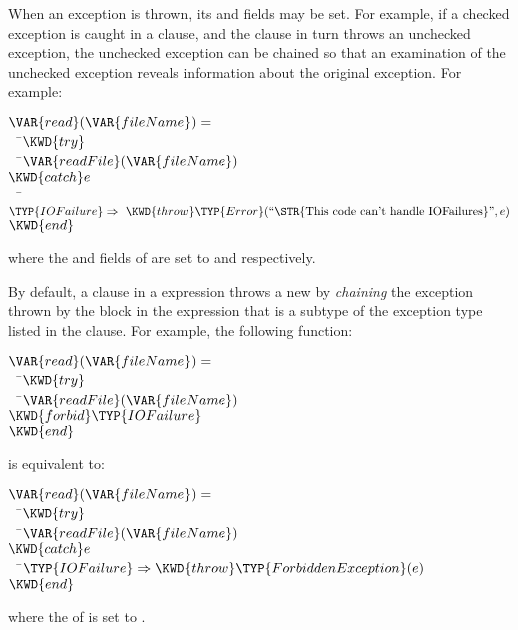 When an exception is thrown, its  and  fields may
be set.
For example, if a checked exception is caught in a  clause, and
the  clause in turn throws an unchecked exception, the unchecked
exception can be chained so that an examination of the unchecked exception
reveals information about the original exception.  For example:
\begin{Fortress}
\(\VAR{read}(\VAR{fileName}) = \)\\
{\tt~~}\pushtabs\=\+\(  \KWD{try}\)\\
{\tt~~}\pushtabs\=\+\(    \VAR{readFile}(\VAR{fileName})\)\-\\\poptabs
\(  \KWD{catch} e\)\\
{\tt~~}\pushtabs\=\+\(    \TYP{IOFailure} \Rightarrow\ \KWD{throw} \TYP{Error}(\hbox{\rm``\STR{This~code~can't~handle~IOFailures}''}, e)\)\-\\\poptabs
\(  \KWD{end}\)\-\\\poptabs
\end{Fortress}
where the  and  fields of  are set to
 and
 respectively.


By default, a  clause in a  expression
throws a new  by \emph{chaining}
the exception thrown by the  block in the 
expression that is a subtype of the exception type listed in the
 clause.
For example, the following  function:
\begin{Fortress}
\(\VAR{read}(\VAR{fileName}) = \)\\
{\tt~~}\pushtabs\=\+\(  \KWD{try}\)\\
{\tt~~}\pushtabs\=\+\(    \VAR{readFile}(\VAR{fileName})\)\-\\\poptabs
\(  \KWD{forbid} \TYP{IOFailure}\)\\
\(  \KWD{end}\)\-\\\poptabs
\end{Fortress}
is equivalent to:
\begin{Fortress}
\(\VAR{read}(\VAR{fileName}) = \)\\
{\tt~~}\pushtabs\=\+\(  \KWD{try}\)\\
{\tt~~}\pushtabs\=\+\(    \VAR{readFile}(\VAR{fileName})\)\-\\\poptabs
\(  \KWD{catch} e\)\\
{\tt~~}\pushtabs\=\+\(    \TYP{IOFailure} \Rightarrow \KWD{throw} \TYP{ForbiddenException}(e)\)\-\\\poptabs
\(  \KWD{end}\)\-\\\poptabs
\end{Fortress}
where the  of  is set to .
